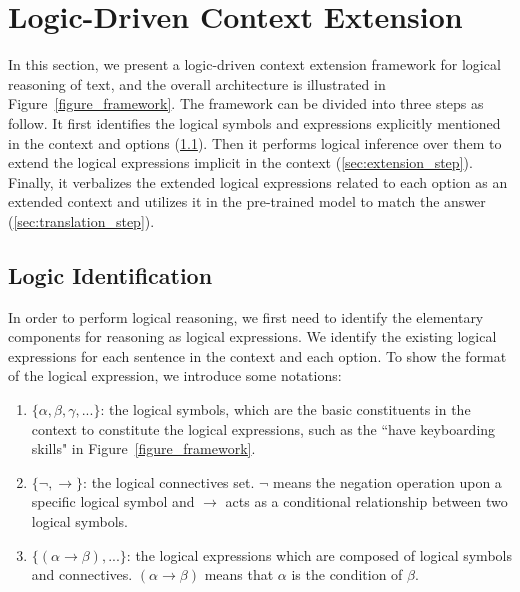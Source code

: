 \documentclass[11pt,a4paper]{article}
\begin{document}
\section{Logic-Driven Context Extension}
In this section, we present a logic-driven context extension framework for logical reasoning of text, and the overall architecture is illustrated in Figure~\ref{figure_framework}. 
The framework can be divided into three steps as follow. It first identifies the logical symbols and expressions explicitly mentioned in the context and options
(\cref{sec:identification_step}). Then it performs logical inference over them to extend the logical expressions implicit in the context (\cref{sec:extension_step}). Finally, it verbalizes the extended logical expressions related to each option as an extended context and utilizes it in the pre-trained model to match the answer (\cref{sec:translation_step}).


\subsection{Logic Identification}
\label{sec:identification_step}
In order to perform logical reasoning, we first need to identify the elementary components for reasoning as logical expressions. 
We identify the existing logical expressions for each sentence in the context and each option. 
To show the format of the logical expression, we introduce some notations:
\begin{enumerate}[(1)]
    \setlength{\itemsep}{1pt}
    \item $\{\alpha, \beta, \gamma,...\}$: the logical symbols, which are the basic constituents in the context to constitute the logical expressions, such as the ``have keyboarding skills" in Figure~\ref{figure_framework}.
    \item $\{\neg, \rightarrow \}$: the logical connectives set. $\neg$ means the negation operation upon a specific logical symbol and $\rightarrow$ acts as a conditional relationship between two logical symbols.
\item $\{(\alpha \rightarrow \beta), ...\}$: the logical expressions which are composed of logical symbols and connectives. $(\alpha \rightarrow \beta)$ means that $\alpha$ is the condition of $\beta$.
\end{enumerate}
\end{document}
